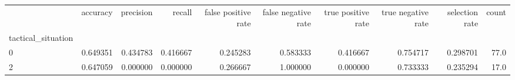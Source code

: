 \begin{tabular}{lrrrrrrrrr}
\toprule
{} &  accuracy &  precision &    recall &  false positive rate &  false negative rate &  true positive rate &  true negative rate &  selection rate &  count \\
tactical\_situation &           &            &           &                      &                      &                     &                     &                 &        \\
\midrule
0                  &  0.649351 &   0.434783 &  0.416667 &             0.245283 &             0.583333 &            0.416667 &            0.754717 &        0.298701 &   77.0 \\
2                  &  0.647059 &   0.000000 &  0.000000 &             0.266667 &             1.000000 &            0.000000 &            0.733333 &        0.235294 &   17.0 \\
\bottomrule
\end{tabular}
